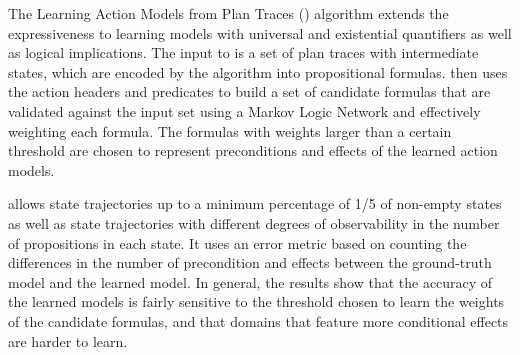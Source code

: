 The Learning Action Models from Plan Traces (\textbf{\LAMP}) \cite{ZhuoYHL10} algorithm extends the expressiveness to learning models with universal and existential quantifiers as well as logical implications. The input to \LAMP is a set of plan traces with intermediate states, which are encoded by the algorithm into propositional formulas. \LAMP then uses the action headers and predicates to build a set of candidate formulas that are validated against the input set using a Markov Logic Network and effectively weighting each formula. The formulas with weights larger than a certain threshold are chosen to represent preconditions and effects of the learned action models.

\LAMP allows \PO state trajectories up to a minimum percentage of 1/5 of non-empty states as well as \POstar state trajectories with different degrees of observability in the number of propositions in each state. It uses an error metric based on counting the differences in the number of precondition and effects between the ground-truth model and the learned model. In general, the results show that the accuracy of the learned models is fairly sensitive to the threshold chosen to learn the weights of the candidate formulas, and that domains that feature more conditional effects are harder to learn.


